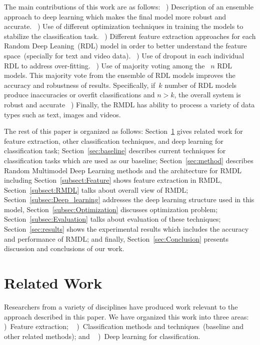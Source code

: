 \documentclass[sigconf, final]{acmart}
\newcommand{\RNum}[1]{%
  \textup{\uppercase\expandafter{\romannumeral#1}}%
}
\begin{document}
The main contributions of this work are as follows:~\RNum{1}) Description of an ensemble approach to deep learning which makes the final model more robust and accurate.~\RNum{2}) Use of different optimization techniques in training the models to stabilize the classification task.~\RNum{3}) Different feature extraction approaches for each Random Deep Leaning~(RDL) model in order to better understand the feature space~(specially for text and video data).~\RNum{4}) Use of dropout in each individual RDL to address over-fitting.~\RNum{5}) Use of majority voting among the ~$n$ RDL models. This majority vote from the ensemble of RDL models improves the accuracy and robustness of results. Specifically, if~$k$ number of RDL models produce inaccuracies or overfit classifications and $n > k$, the overall system is robust and accurate~\RNum{6}) Finally, the RMDL has ability to process a variety of data types such as text, images and videos.


The rest of this paper is organized as follows: Section~\ref{sec:related} gives related work for feature extraction, other classification techniques, and deep learning for classification task;   Section~\ref{sec:baseline} describes current techniques for classification tasks which are used as our baseline; Section~\ref{sec:method} describes Random Multimodel Deep Learning methods and the architecture for RMDL including Section~\ref{subsect:Feature} shows feature extraction in RMDL, Section~\ref{subsect:RMDL} talks about overall view of RMDL; Section~\ref{subsec:Deep_learning} addresses the deep learning structure used in this model, Section~\ref{subsec:Optimization} discusses optimization problem; Section~\ref{subsec:Evaluation} talks about evaluation of these techniques; Section~\ref{sec:results} shows the experimental results which includes the accuracy and performance of RMDL; and finally, Section~\ref{sec:Conclusion} presents discussion and conclusions of our work.

\vspace{-0.1in}\section{Related Work}\label{sec:related}
Researchers from a variety of disciplines have produced work relevant to the approach described in this paper. We have organized this work into three areas: %
~\RNum{1})~Feature extraction; ~\RNum{2})~Classification methods and techniques~(baseline and other related methods); and ~\RNum{3})~Deep learning for classification.
\end{document}
